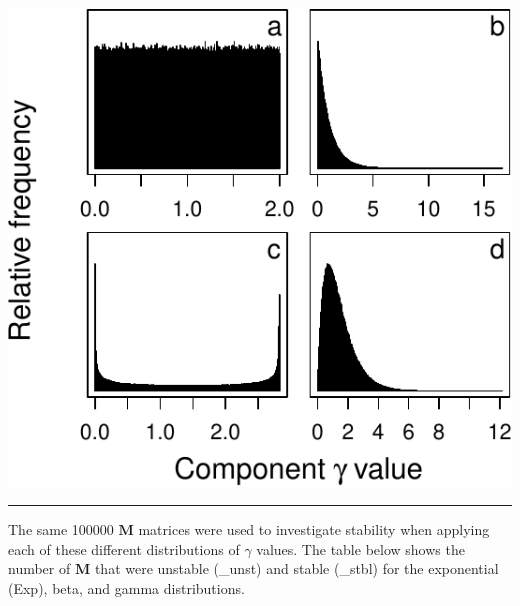 \documentclass[]{article}
\begin{document}
\begin{center}\includegraphics{SI_files/figure-latex/unnamed-chunk-21-1} \end{center}

\begin{center}\rule{0.5\linewidth}{\linethickness}\end{center}

The same 100000 \(\mathbf{M}\) matrices were used to investigate
stability when applying each of these different distributions of
\(\gamma\) values. The table below shows the number of \(\mathbf{M}\)
that were unstable (\_unst) and stable (\_stbl) for the exponential
(Exp), beta, and gamma distributions.
\end{document}
